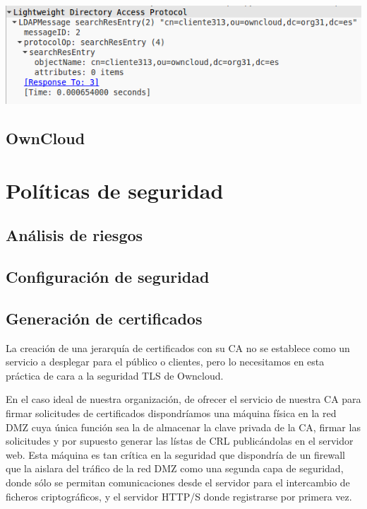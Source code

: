 \documentclass[]{article}
\begin{document}
\begin{center}
	\includegraphics[scale=0.5]{images/ldap/ldap6}
\end{center}




\subsection{OwnCloud}
\section{Políticas de seguridad}

\subsection{Análisis de riesgos}

\subsection{Configuración de seguridad}

\subsection{Generación de certificados}

La creación de una jerarquía de certificados con su CA no se establece como un servicio a desplegar para el público o clientes, pero lo necesitamos en esta práctica de cara a la seguridad TLS de Owncloud.

En el caso ideal de nuestra organización, de ofrecer el servicio de nuestra CA para firmar solicitudes de certificados dispondríamos una máquina física en la red DMZ cuya única función sea la de almacenar la clave privada de la CA, firmar las solicitudes y por supuesto generar las lístas de CRL publicándolas en el servidor web. Esta máquina es tan crítica en la seguridad que dispondría de un firewall que la aislara del tráfico de la red DMZ como una segunda capa de seguridad, donde sólo se permitan comunicaciones desde el servidor para el intercambio de ficheros criptográficos, y el servidor HTTP/S donde registrarse por primera vez.
\end{document}
